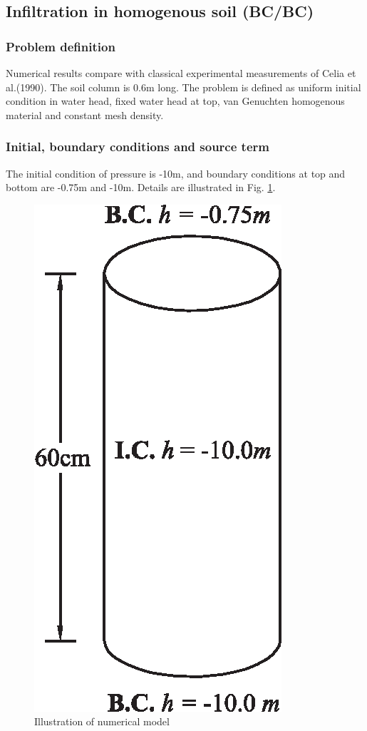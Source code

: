 \subsection{Infiltration in homogenous soil (BC/BC)}
\subsubsection*{Problem definition}
Numerical results compare with classical experimental measurements
of Celia et al.(1990). The soil column is 0.6m long. The problem
is defined as uniform initial condition in water head, fixed water
head at top, van Genuchten homogenous material and constant mesh
density.
%
\subsubsection*{Initial, boundary conditions and source term}
The initial condition of pressure is -10m, and boundary conditions
at top and bottom are -0.75m and -10m. Details are illustrated in
Fig. \ref{us:celia}.
%
\begin{figure} [h]
 \centering
 \includegraphics[width=0.20\columnwidth] {H_US/figures/illustration_celia.eps}
 \caption{Illustration of numerical model}
 \label{us:celia}
\end{figure}

